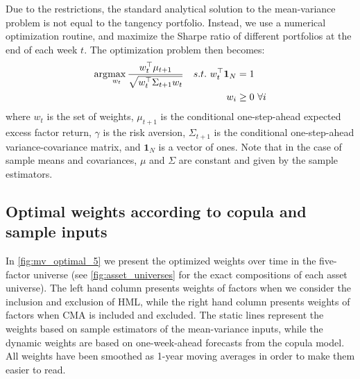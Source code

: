 Due to the restrictions, the standard analytical solution to the mean-variance problem is not equal to the tangency portfolio. Instead, we use a numerical optimization routine, and maximize the Sharpe ratio of different portfolios at the end of each week $t$. The optimization problem then becomes:
\begin{align}
	\arg\!\max_{w_t} \frac{w_t^\top \mu_{t+1}}{\sqrt{w_t^\top \Sigma_{t+1} w_t}} && s.t.\,\,w_t^\top \mathbf{1}_N &= 1 \\
	&& w_i &\geq 0 \,\, \forall i \notag
\end{align}
where $w_t$ is the set of weights, $\mu_{t+1}$ is the conditional one-step-ahead expected excess factor return, $\gamma$ is the risk aversion, $\Sigma_{t+1}$ is the conditional one-step-ahead variance-covariance matrix, and $\mathbf{1}_N$ is a vector of ones. Note that in the case of sample means and covariances, $\mu$ and $\Sigma$ are constant and given by the sample estimators. 

\subsection{Optimal weights according to copula and sample inputs}
In \autoref{fig:mv_optimal_5} we present the optimized weights over time in the five-factor universe (see \autoref{fig:asset_universes} for the exact compositions of each asset universe). The left hand column presents weights of factors when we consider the inclusion and exclusion of HML, while the right hand column presents weights of factors when CMA is included and excluded. The static lines represent the weights based on sample estimators of the mean-variance inputs, while the dynamic weights are based on one-week-ahead forecasts from the copula model. All weights have been smoothed as 1-year moving averages in order to make them easier to read. 

